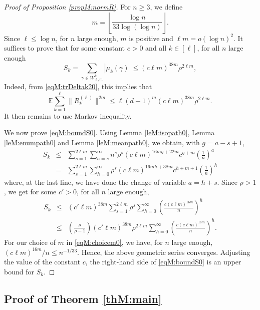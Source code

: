 \documentclass[11pt]{article}
\newcommand{\dE}{\mathbb {E}}
\newcommand{\PAR}[1]{{{\left(#1\right)}}} %
\newcommand{\1}{1\!\!{\sf I}}\newcommand{\IND}{\1}
\begin{document}
\begin{proof}[Proof of Proposition \ref{propM:normR}]
For $n \geq 3$, we define 
\begin{equation}\label{eqM:choicem0}
m = \left\lfloor  \frac{ \log n }{33 \log (\log n)} \right\rfloor.
\end{equation}
Since $\ell \leq \log n$, for $n$ large enough, $m$ is positive and $\ell m = o ( \log n) ^2$. It suffices to prove that for some constant $c >0$ and all $k \in [\ell]$, for all $n$ large enough
\begin{equation}\label{eqM:boundS0}
S_k = \sum_{\gamma \in W^k_{\ell,m} }   | \mu_k(\gamma) | \leq (c \ell  m )^{38 m} \rho^{2 \ell m},
\end{equation}
Indeed, from \eqref{eqM:trDeltak20}, this implies that 
$$
\dE \sum_{k=1} ^\ell \| R^{(\ell)}_{k}  \| ^{2 m} \leq \ell (d-1)^{m} (c \ell  m )^{38 m} \rho^{2 \ell m}.
$$ 
It then remains to use Markov inequality.

We now prove \eqref{eqM:boundS0}. Using  Lemma \ref{leM:isopath0}, Lemma \ref{leM:enumpath0} and Lemma \ref{leM:meanpath0}, we obtain, with $g = a - s +1$,
\begin{eqnarray*}
S_k & \leq &  \sum_{s=1}^{2 \ell m} \sum_{a = s} ^{ \infty } n^s \rho ^s    (c \ell  m )^{16 m g + 22 m} c^{g+ m } \PAR{\frac{ 1 }{n} }^a \\
& = &  \sum_{s=1}^{2 \ell m} \sum_{h = 0} ^{ \infty }  \rho ^s    (c \ell  m )^{16 m h + 38 m} c^{ h+ m +1} \PAR{\frac{ 1 }{n} }^h 
 \end{eqnarray*}
where, at the last line, we have done the change of variable $a = h +s$. Since $\rho >1$, we get for some  $c ' >0$, for all $n$ large enough, 
\begin{eqnarray*}
S_k & \leq  &    (c' \ell  m )^{38 m}   \sum_{s=1}^{ 2 \ell m } \rho^{s} \sum_{h=0} ^{\infty} \PAR{\frac{ c (c \ell m) ^{16 m} }{ n } }^{h} \\
& \leq &  \PAR{ \frac{\rho}{\rho-1}} (c' \ell  m )^{38 m}  \rho^{2 \ell m}  \sum_{h=0} ^{\infty} \PAR{\frac{ c (c \ell m) ^{16 m} }{ n } }^{h}.
\end{eqnarray*}
For our choice of $m$ in \eqref{eqM:choicem0}, we have, for $n$ large enough, 
$
   (c \ell m) ^{16 m} /  n   \leq n^{-1/33}. 
$
Hence, the above geometric series converges. Adjusting the value of the constant $c$, the right-hand side of \eqref{eqM:boundS0} is an upper bound for $S_k$. \end{proof}



\subsection{Proof of Theorem \ref{thM:main}}
\end{document}
